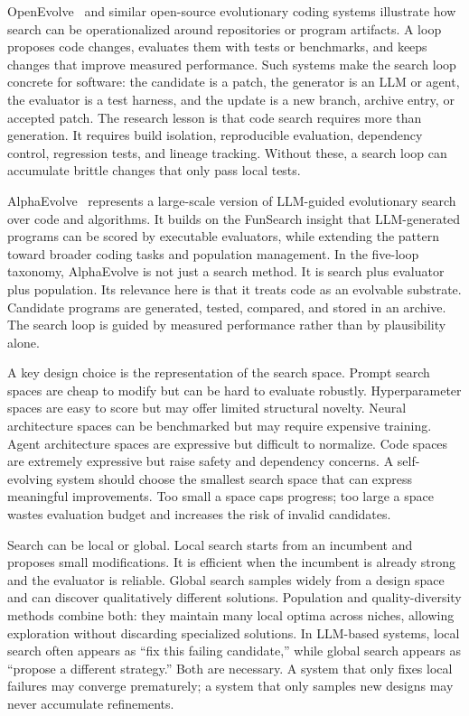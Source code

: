 OpenEvolve~\cite{openevolve2024} and similar open-source evolutionary coding systems illustrate how search can be operationalized around repositories or program artifacts.  A loop proposes code changes, evaluates them with tests or benchmarks, and keeps changes that improve measured performance.  Such systems make the search loop concrete for software: the candidate is a patch, the generator is an LLM or agent, the evaluator is a test harness, and the update is a new branch, archive entry, or accepted patch.  The research lesson is that code search requires more than generation.  It requires build isolation, reproducible evaluation, dependency control, regression tests, and lineage tracking.  Without these, a search loop can accumulate brittle changes that only pass local tests.

AlphaEvolve~\cite{alphaevolve2025} represents a large-scale version of LLM-guided evolutionary search over code and algorithms.  It builds on the FunSearch insight that LLM-generated programs can be scored by executable evaluators, while extending the pattern toward broader coding tasks and population management.  In the five-loop taxonomy, AlphaEvolve is not just a search method.  It is search plus evaluator plus population.  Its relevance here is that it treats code as an evolvable substrate.  Candidate programs are generated, tested, compared, and stored in an archive.  The search loop is guided by measured performance rather than by plausibility alone.

A key design choice is the representation of the search space.  Prompt search spaces are cheap to modify but can be hard to evaluate robustly.  Hyperparameter spaces are easy to score but may offer limited structural novelty.  Neural architecture spaces can be benchmarked but may require expensive training.  Agent architecture spaces are expressive but difficult to normalize.  Code spaces are extremely expressive but raise safety and dependency concerns.  A self-evolving system should choose the smallest search space that can express meaningful improvements.  Too small a space caps progress; too large a space wastes evaluation budget and increases the risk of invalid candidates.

Search can be local or global.  Local search starts from an incumbent and proposes small modifications.  It is efficient when the incumbent is already strong and the evaluator is reliable.  Global search samples widely from a design space and can discover qualitatively different solutions.  Population and quality-diversity methods combine both: they maintain many local optima across niches, allowing exploration without discarding specialized solutions.  In LLM-based systems, local search often appears as ``fix this failing candidate,'' while global search appears as ``propose a different strategy.''  Both are necessary.  A system that only fixes local failures may converge prematurely; a system that only samples new designs may never accumulate refinements.

